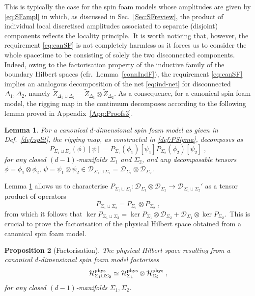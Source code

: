 \documentclass[11pt]{article}
\newcommand{\cD}{\mathcal{D}}
\newcommand{\h}{\mathcal{H}}
\newtheorem{proposition}{Proposition}[section]
\newtheorem{lemma}[proposition]{Lemma}
\theoremstyle{definition}
\numberwithin{equation}{section}
\begin{document}
This is typically the case for the spin foam models whose amplitudes are given by \eqref{eq:SFampl} in which, as discussed in Sec.~\ref{Sec:SFreview}, the product of individual local discretised amplitudes associated to separate (disjoint) components reflects the locality principle.~It is worth noticing that, however, the requirement \eqref{eq:canSF} is not completely harmless as it forces us to consider the whole spacetime to be consisting of solely the two disconnected components. Indeed, owing to the factorisation property of the inductive family of the boundary Hilbert spaces (cfr.~Lemma~\ref{connIndF}), the requirement \eqref{eq:canSF} implies an analogous decomposition of the net \eqref{eq:ind-net} for disconnected $\Delta_1,\Delta_2$, namely $\tilde{Z}_{\Delta_1\sqcup\Delta_2}=\tilde{Z}_{\Delta_1}\otimes\tilde{Z}_{\Delta_2}$. As a consequence, for a canonical spin foam model, the rigging map in the continuum decomposes according to the following lemma proved in Appendix~\ref{App:Proofs3}.
\begin{lemma}\label{lem:factphys}
    For a canonical $d$-dimensional spin foam model as given in \emph{Def.~\ref{def:split}}, the rigging map, as constructed in \eqref{def:PSigma}, decomposes as
    \begin{equation}
        P_{\Sigma_1\sqcup\Sigma_2}(\phi)[\psi]=P_{\Sigma_1}(\phi_1)[\psi_1]P_{\Sigma_2}(\phi_2)[\psi_2]\;,
    \end{equation}
    for any closed $(d-1)$-manifolds $\Sigma_1$ and $\Sigma_2$, and any decomposable tensors $\phi=\phi_1\otimes\phi_2,\,\psi=\psi_1\otimes\psi_2\in\cD_{\Sigma_1\sqcup\Sigma_2}=\cD_{\Sigma_1}\otimes\cD_{\Sigma_2}$.
\end{lemma}
Lemma \ref{lem:factphys} allows us to characterise $P_{\Sigma_1\sqcup\Sigma_2}:\cD_{\Sigma_1}\otimes\cD_{\Sigma_2}\to\cD_{\Sigma_1\sqcup\Sigma_2}'$ as a tensor product of operators
\begin{equation}
    P_{\Sigma_1\sqcup\Sigma_2}=P_{\Sigma_1}\otimes P_{\Sigma_2}\;,
\end{equation}
from which it follows that $\ker P_{\Sigma_1\sqcup\Sigma_2}=\ker P_{\Sigma_1}\otimes \cD_{\Sigma_2}+\cD_{\Sigma_1}\otimes\ker P_{\Sigma_2}$.~This is crucial to prove the factorisation of the physical Hilbert space obtained from a canonical spin foam model.
\begin{proposition}[Factorisation]\label{prop:factphys}
    The physical Hilbert space resulting from a canonical $d$-dimensional spin foam model factorises
    \begin{equation*}
        \h^{\rm phys}_{\Sigma_1\sqcup\Sigma_2}\simeq\h^{\rm phys}_{\Sigma_1}\otimes \h^{\rm phys}_{\Sigma_2}\;,
    \end{equation*}
    for any closed $(d-1)$-manifolds $\Sigma_1,\Sigma_2$.
\end{proposition}
\end{document}
